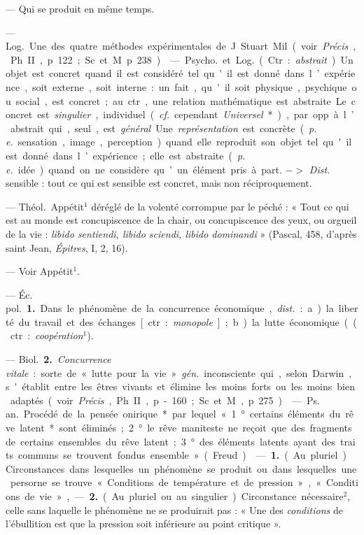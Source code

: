 \begin{itemize}[leftmargin=1cm, label=, itemsep=11pt]
 — Qui se produit en
même temps.

 — \si{Log.}
Une des quatre méthodes expérimentales de J. Stuart Mil (voir
{\it Précis}, Ph. II, p. 122; Sc. et M.
p. 238).

 — \si{Psycho.} et \si{Log.} (Ctr. :
{\it abstrait}). Un objet est concret quand
il est considéré tel qu'il est donné
dans l’expérience, soit externe, soit
interne : un fait, qu'il soit physique,
psychique ou social, est concret; au
ctr., une relation mathématique est
abstraite. Le concret est {\it singulier},
individuel ({\it cf.} cependant {\it Universel}*),
par opp. à l’abstrait qui, seul, est
{\it général}. Une {\it représentation} est concrète ({\it p. e.} sensation, image, perception) quand elle reproduit son
objet tel qu'il est donné dans l’expérience; elle est abstraite ({\it p. e.} idée)
quand on ne considère qu’un élément pris à part. $->$ {\it Dist.} sensible : tout ce qui est sensible est
concret, mais non réciproquement.

 — \si{Théol.} Appétit$^1$ déréglé de la volenté corrompue par
le péché : « Tout ce qui est au
monde est concupiscence de la chair,
ou concupiscence des yeux, ou
orgueil de la vie : {\it libido sentiendi,
libido sciendi, libido dominandi} »
(Pascal, 458, d’après saint Jean,
{\it Épitres}, I, 2, 16).

 — Voir Appétit$^1$.

 — \si{Éc. pol.} {\bf 1.} Dans le
phénomène de la concurrence économique, {\it dist.} : a) la liberté du travail
et des échanges [ctr. : {\it monopole}];
b) la lutte économique ((ctr. : {\it coopération}$^1$).

— \si{Biol.} {\bf 2.} {\it Concurrence vitale} :
sorte de « lutte pour la vie »  {\it gén.}
inconsciente qui, selon Darwin,
s'établit entre les êtres vivants et
élimine les moins forts ou les moins
bien adaptés (voir  {\it Précis}, Ph. II,
p- 160; Sc. et M., p. 275).

 — \si{Ps. an.} Procédé de
la pensée onirique* par lequel
« 1° certains éléments du rêve latent*
sont éliminés; 2° le rêve maniteste
ne reçoit que des fragments de certains ensembles du rêve latent;
3° des éléments latents ayant des
traits communs se trouvent fondus
ensemble » (Freud).

 — {\bf 1.} (Au pluriel). Circonstances dans lesquelles un phénomène se produit ou dans lesquelles une persorne se trouve
« Conditions de température et de
pression », « Conditions de vie », —
 {\bf 2.} (Au pluriel ou au singulier). Circonstance nécessaire$^2$, celle sans
laquelle le phénomène ne se produirait
pas : « Une des {\it conditions} de
l'ébullition est que la pression soit
inférieure au point critique ».


\end{itemize}
